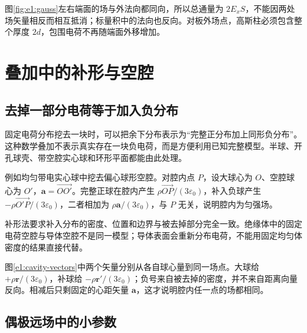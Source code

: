图\ref{fig:e1:gauss}左右端面的场与外法向都同向，所以总通量为 $2E_xS$，不能因两处场矢量相反而相互抵消；标量积中的法向也反向。对板外场点，高斯柱必须包含整个厚度 $2d$，包围电荷不再随端面外移增加。

\section{叠加中的补形与空腔}
\subsection{去掉一部分电荷等于加入负分布}

固定电荷分布挖去一块时，可以把余下分布表示为“完整正分布加上同形负分布”。这种数学叠加不表示真实存在一块负电荷，而是方便利用已知完整模型。半球、开孔球壳、带空腔实心球和环形平面都能由此处理。

例如均匀带电实心球中挖去偏心球形空腔。对腔内点 $P$，设大球心为 $O$、空腔球心为 $O'$，$\bm a=\overrightarrow{OO'}$。完整正球在腔内产生 $\rho\overrightarrow{OP}/(3\varepsilon_0)$，补入负球产生 $-\rho\overrightarrow{O'P}/(3\varepsilon_0)$，二者相加为 $\rho\bm a/(3\varepsilon_0)$，与 $P$ 无关，说明腔内为匀强场。

补形法要求补入分布的密度、位置和边界与被去掉部分完全一致。绝缘体中的固定电荷空腔与导体空腔不是同一模型；导体表面会重新分布电荷，不能用固定均匀体密度的结果直接代替。


图\ref{e1:cavity-vectors}中两个矢量分别从各自球心量到同一场点。大球给 $+\rho\bm r/(3\varepsilon_0)$，补球给 $-\rho\bm r'/(3\varepsilon_0)$；负号来自被去掉的密度，并不来自距离向量反向。相减后只剩固定的心距矢量 $\bm a$，这才说明腔内任一点的场都相同。

\subsection{偶极远场中的小参数}

